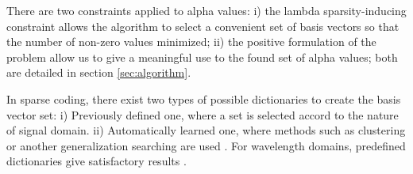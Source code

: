 There are two constraints applied to alpha values: i) the lambda sparsity-inducing constraint allows the algorithm to select a convenient set of basis vectors so that the number of non-zero values minimized;  ii) the positive formulation of the problem allow us to give a meaningful use to the found set of alpha values; both are detailed in section \ref{sec:algorithm}. 

In sparse coding, there exist two types of possible dictionaries to create the basis vector set:
i) Previously defined one, where a set is selected accord to the nature of signal domain.
ii) Automatically learned one, where methods such as clustering or another generalization searching are used \citep{mairal_online_2009}.
For wavelength domains, predefined dictionaries give satisfactory results \citep{mallat2009}.

